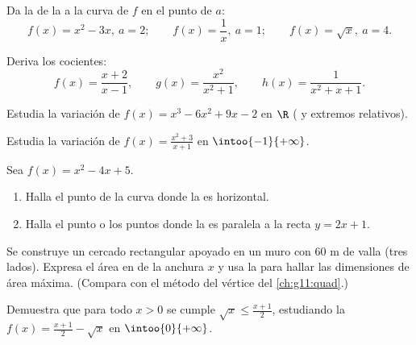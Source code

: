 \begin{exercise}[$\star$]\label{exo:g11:deriv:3}
Da la  de la  a la curva de $f$ en el punto de 
$a$:
\[
f(x) = x^2 - 3x, \ a = 2; \qquad
f(x) = \frac1x, \ a = 1; \qquad
f(x) = \sqrt x, \ a = 4 .
\]
\end{exercise}

\begin{exercise}[$\star$]\label{exo:g11:deriv:4}
Deriva los cocientes:
\[
f(x) = \frac{x+2}{x-1}, \qquad
g(x) = \frac{x^2}{x^2+1}, \qquad
h(x) = \frac{1}{x^2 + x + 1} .
\]
\end{exercise}

\begin{exercise}[$\star\star$]\label{exo:g11:deriv:5}
Estudia la variación de $f(x) = x^3 - 6x^2 + 9x - 2$ en $\R$ ( y extremos relativos).
\end{exercise}

\begin{exercise}[$\star\star$]\label{exo:g11:deriv:6}
Estudia la variación de $f(x) = \frac{x^2 + 3}{x + 1}$ en
$\intoo{-1}{+\infty}$.
\end{exercise}

\begin{exercise}[$\star\star$]\label{exo:g11:deriv:7}
Sea $f(x) = x^2 - 4x + 5$.
\begin{enumerate}
  \item Halla el punto de la curva donde la  es horizontal.
  \item Halla el punto o los puntos donde la  es paralela a la
        recta $y = 2x + 1$.
\end{enumerate}
\end{exercise}

\begin{exercise}[$\star\star$]\label{exo:g11:deriv:8}
Se construye un cercado rectangular apoyado en un muro con $60$ m de valla
(tres lados). Expresa el área en  de la anchura $x$ y usa la
 para hallar las dimensiones de área máxima. (Compara con el
método del vértice del \cref{ch:g11:quad}.)
\end{exercise}

\begin{exercise}[$\star\star$]\label{exo:g11:deriv:9}
Demuestra que para todo $x > 0$ se cumple $\sqrt{x} \leq \frac{x + 1}{2}$,
estudiando la  $f(x) = \frac{x+1}{2} - \sqrt x$ en
$\intoo{0}{+\infty}$.
\end{exercise}

